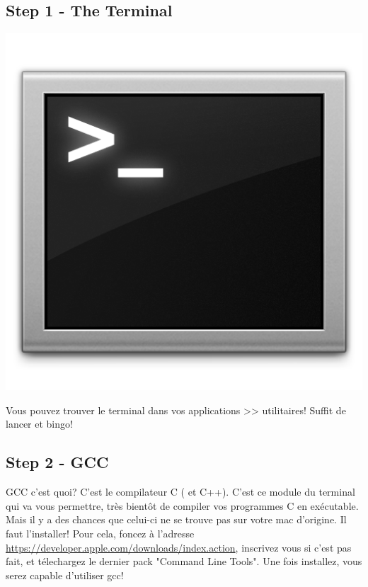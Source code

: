 \documentclass[11pt,a4paper]{article}
\begin{document}
\subsection{Step 1 - The Terminal}
\begin{minipage}[c]{.20\linewidth}
\includegraphics[width=\linewidth]{terminal.png}
\end{minipage} \hfill
\begin{minipage}[c]{.74\linewidth}
Vous pouvez trouver le terminal dans vos applications >> utilitaires! Suffit de lancer et bingo!
\end{minipage}

\subsection{Step 2 - GCC}

GCC c'est quoi? C'est le compilateur C ( et C++). C'est ce module du terminal qui va vous permettre, très bientôt de compiler vos programmes C en exécutable. Mais il y a des chances que celui-ci ne se trouve pas sur votre mac d'origine. Il faut l'installer! Pour cela, foncez à l'adresse \url{https://developer.apple.com/downloads/index.action}, inscrivez vous si c'est pas fait, et télechargez le dernier pack "Command Line Tools". Une fois installez, vous serez capable d'utiliser gcc!
\end{document}
